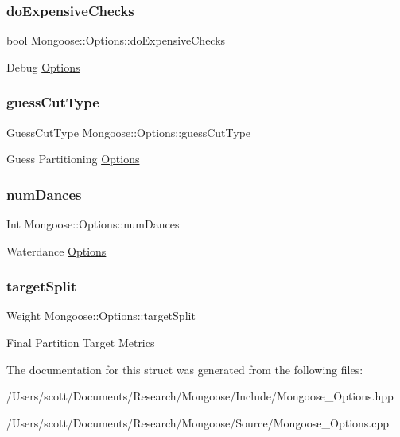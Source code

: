 \subsubsection{\texorpdfstring{do\+Expensive\+Checks}{doExpensiveChecks}}
{\footnotesize\ttfamily bool Mongoose\+::\+Options\+::do\+Expensive\+Checks}

Debug \hyperlink{struct_mongoose_1_1_options}{Options} \hypertarget{struct_mongoose_1_1_options_a31abd6eab9505fb7d3964e314f75b18c}{}\label{struct_mongoose_1_1_options_a31abd6eab9505fb7d3964e314f75b18c} 
\subsubsection{\texorpdfstring{guess\+Cut\+Type}{guessCutType}}
{\footnotesize\ttfamily Guess\+Cut\+Type Mongoose\+::\+Options\+::guess\+Cut\+Type}

Guess Partitioning \hyperlink{struct_mongoose_1_1_options}{Options} \hypertarget{struct_mongoose_1_1_options_ab1d4fb2e1c43f58fd0e3b0af718cc47e}{}\label{struct_mongoose_1_1_options_ab1d4fb2e1c43f58fd0e3b0af718cc47e} 
\subsubsection{\texorpdfstring{num\+Dances}{numDances}}
{\footnotesize\ttfamily Int Mongoose\+::\+Options\+::num\+Dances}

Waterdance \hyperlink{struct_mongoose_1_1_options}{Options} \hypertarget{struct_mongoose_1_1_options_a26ae6bb0a93bd36a365c472877b6d5e9}{}\label{struct_mongoose_1_1_options_a26ae6bb0a93bd36a365c472877b6d5e9} 
\subsubsection{\texorpdfstring{target\+Split}{targetSplit}}
{\footnotesize\ttfamily Weight Mongoose\+::\+Options\+::target\+Split}

Final Partition Target Metrics 

The documentation for this struct was generated from the following files\+:\begin{DoxyCompactItemize}
\item 
/\+Users/scott/\+Documents/\+Research/\+Mongoose/\+Include/Mongoose\+\_\+\+Options.\+hpp\item 
/\+Users/scott/\+Documents/\+Research/\+Mongoose/\+Source/Mongoose\+\_\+\+Options.\+cpp\end{DoxyCompactItemize}
